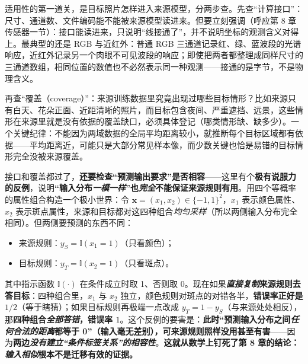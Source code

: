 适用性的第一道关，是目标照片怎样进入来源模型，分两步查。先查“计算接口”：尺寸、通道数、文件编码能不能被来源模型读进来。但要立刻强调（呼应第 8 章传感器一节）：接口能读进来，只说明“线接通了”，并不说明坐标的观测含义对得上。最典型的还是 RGB 与近红外：普通 RGB 三通道记录红、绿、蓝波段的光谱响应，近红外记录另一个肉眼不可见波段的响应；即使把两者都整理成同样尺寸的三通道数组，相同位置的数值也不必然表示同一种观测——接通的是字节，不是物理含义。

再查“覆盖（coverage）”：来源训练数据里究竟出现过哪些目标情形？比如来源只有白天、花朵正面、近距清晰的照片，而目标包含夜间、严重遮挡、远景，这些情形在来源里就是没有依据的覆盖缺口，必须具体登记（哪类情形缺、缺多少）。一个关键纪律：不能因为两域数据的全局平均距离较小，就推断每个目标区域都有依据——平均距离近，可能只是大部分常见样本像，而少数关键也恰是易错的目标情形完全没被来源覆盖。

接口和覆盖都过了，\textbf{还要检查“预测输出要求”是否相容}——这里有个\textbf{极有说服力的反例}，说明\textbf{“输入分布\emph{一模一样}”也\emph{完全}不能保证来源规则有用}。用四个等概率的属性组合构造一个极小世界：令 $\bm{x}=(x_1,x_2)\in\{-1,1\}^2$，$x_1$ 表示颜色属性、$x_2$ 表示斑点属性，来源和目标都对这四种组合\emph{均匀采样}（所以两侧输入分布完全相同）。但两侧要预测的东西不同：
\begin{itemize}\item 来源规则：$y_S=\mathbb{I}(x_1=1)$（只看颜色）；\item 目标规则：$y_T=\mathbb{I}(x_2=1)$（只看斑点）。\end{itemize}
其中指示函数 $\mathbb I(\cdot)$ 在条件成立时取 1、否则取 0。现在如果\textbf{\emph{直接复制}来源规则去答目标}：四种组合里，$x_1$ 与 $x_2$ 独立，颜色规则对斑点的对错各半，\textbf{错误率正好是 $1/2$}（等于瞎猜）；如果目标规则再极端一点改成 $y_T=1-y_S$（与来源处处相反），那\textbf{四种组合\emph{全部答错}，错误率 $1$}。这个反例的要害是：\textbf{此时“预测输入分布之间\emph{任何合法的距离}都等于 0”（输入毫无差别），可来源规则照样没用甚至有害}——因为\textbf{两边\emph{没有建立“条件标签关系”的相容性}}。\textbf{这就从数学上钉死了第 8 章的结论：\emph{输入相似}根本不是迁移有效的证据。}


